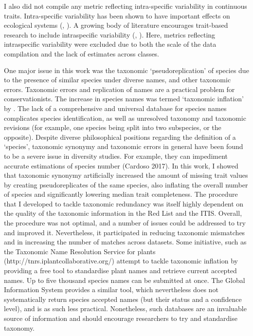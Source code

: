 I also did not compile any metric reflecting intra-specific variability in continuous traits. Intra-specific variability has been shown to have important effects on ecological systems (\cite{DesRoches2018}, \cite{Bolnick2011}). A growing body of literature encourages trait-based research to include intraspecific variability (\cite{Carmona2016}, \cite{Violle2012}). Here, metrics reflecting intraspecific variability were excluded due to both the scale of the data compilation and the lack of estimates across classes.

One major issue in this work was the taxonomic `pseudoreplication' of species due to the presence of similar species under diverse names, and other taxonomic errors. Taxonomic errors and replication of names are a practical problem for conservationists. The increase in species names was termed `taxonomic inflation' by \cite{Isaac2004}.
The lack of a comprehensive and universal database for species names complicates species identification, as well as unresolved taxonomy and taxonomic revisions (for example, one species being split into two subspecies, or the opposite).
Despite diverse philosophical positions regarding the definition of a `species',  taxonomic synonymy and taxonomic errors in general have been found to be a severe issue in diversity studies. For example, they can impediment accurate estimations of species number (Cardoso 2017). In this work, I showed that taxonomic synonymy artificially increased the amount of missing trait values by creating pseudoreplicates of the same species, also inflating the overall number of species and significantly lowering median trait completeness. The procedure that I developed to tackle taxonomic redundancy was itself highly dependent on the quality of the taxonomic information in the Red List and the ITIS. Overall, the procedure was not optimal, and a number of issues could be addressed to try and improved it. Nevertheless, it participated in reducing taxonomic mismatches and in increasing the number of matches across datasets. Some initiative, such as the Taxonomic Name Resolution Service for plants (http://tnrs.iplantcollaborative.org/) attempt to tackle taxonomic inflation by providing a free tool to standardise plant names and retrieve current accepted names. Up to five thousand species names can be submitted at once. The Global Information System provides a similar tool, which nevertheless does not systematically return species accepted names (but their status and a confidence level), and is as such less practical. Nonetheless, such databases are an invaluable source of information and should encourage researchers to try and standardise taxonomy.


